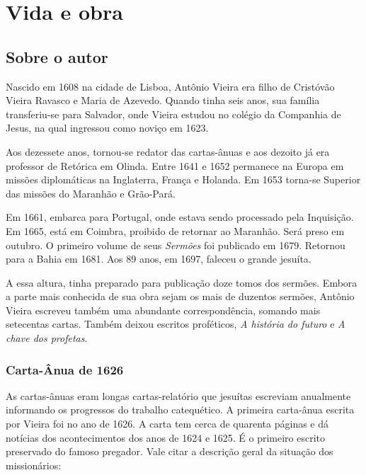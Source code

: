 \chapter{Vida e obra}

\section{Sobre o autor}

Nascido em 1608 na cidade de Lisboa, Antônio Vieira era filho de
Cristóvão Vieira Ravasco e Maria de Azevedo. Quando tinha seis anos, sua
família transferiu-se para Salvador, onde Vieira estudou no colégio da
Companhia de Jesus, na qual ingressou como noviço em 1623.

Aos dezessete anos, tornou-se redator das cartas-ânuas e aos dezoito já
era professor de Retórica em Olinda. Entre 1641 e 1652 permanece na
Europa em missões diplomáticas na Inglaterra, França e Holanda. Em 1653
torna-se Superior das missões do Maranhão e Grão-Pará.

Em 1661, embarca para Portugal, onde estava sendo processado pela
Inquisição. Em 1665, está em Coimbra, proibido de retornar ao Maranhão.
Será preso em outubro. O primeiro volume de seus \emph{Sermões} foi
publicado em 1679. Retornou para a Bahia em 1681. Aos 89 anos, em 1697,
faleceu o grande jesuíta.

A essa altura, tinha preparado para publicação doze tomos dos sermões.
Embora a parte mais conhecida de sua obra sejam os mais de duzentos
sermões, Antônio Vieira escreveu também uma abundante correspondência,
somando mais setecentas cartas. Também deixou escritos proféticos,
\emph{A história do futuro} e \emph{A chave dos profetas}.

\subsection{Carta-Ânua de 1626}

As cartas-ânuas eram longas cartas-relatório que jesuítas escreviam
anualmente informando os progressos do trabalho catequético. A primeira
carta-ânua escrita por Vieira foi no ano de 1626. A carta tem cerca de
quarenta páginas e dá notícias dos acontecimentos dos anos de 1624 e
1625. É o primeiro escrito preservado do famoso pregador. Vale citar a
descrição geral da situação dos missionários:

